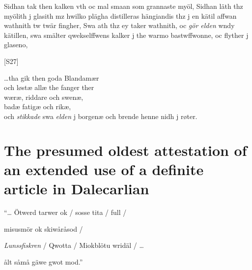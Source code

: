 
Sidhan tak then kalken vth oc mal smaan som grannaste myöl, Sidhan läth thz myölith j glasith mz hwilko plägha distilleras hängiandis thz j en kätil affwan wathnith tw twär fingher, Swa ath thz ey taker wathnith, oc \textit{gör elden} wndy kätillen, swa smälter qwekselffwens kalker j the warmo bastwffwonne, oc flyther j glaseno, 


[S27]


…tha gik then goda Blandamær\\
och løstæ allæ the fanger ther\\
wæræ, riddare och swenæ,\\
badæ fatigæ och rikæ,\\
och \textit{stikkade} swa \textit{elden} j borgenæ och brende henne nidh j røter.


\section{The presumed oldest attestation of an extended use of a definite article in Dalecarlian}

“… Ötwerd tarwer ok / sosse tita / full /


misusmör ok skiwåråsod /


\textit{Lunssfiskren} / Qwotta / Miokblötu wridäl / …


ålt såmå gäwe gwot mod.”


